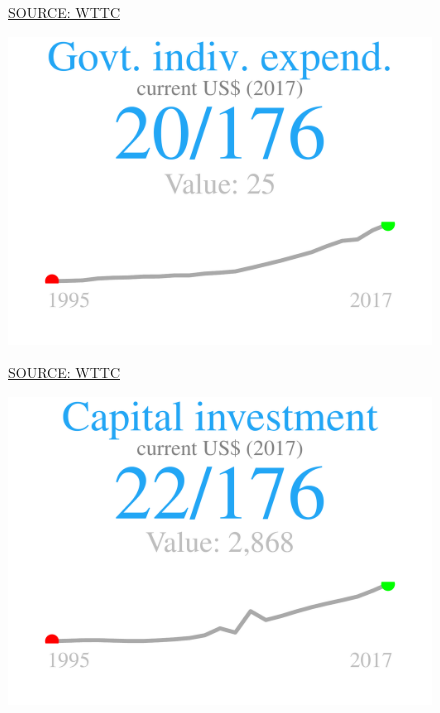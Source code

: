 \documentclass{article}\usepackage[]{graphicx}\usepackage[]{color}
\makeatletter
\def\maxwidth{ %
  \ifdim\Gin@nat@width>\linewidth
    \linewidth
  \else
    \Gin@nat@width
  \fi
}
\makeatother
\begin{document}
\begin{figure}
\begin{minipage}[t]{0.99\textwidth}
\begin{minipage}[t]{0.56\textwidth}
\begin{minipage}[c]{0.30\textwidth}
{}



    \vspace{-2ex}
    \hspace{2ex}\tiny{\href{https://tool.wttc.org/}{\textcolor[HTML]{722FF5}{SOURCE: WTTC}}}
    \end{minipage}
    \begin{minipage}[c]{0.30\textwidth}


{\centering \includegraphics[width=\maxwidth]{figure/figure_sparkline5-1} 

}



    \vspace{-2ex}
    \hspace{2ex}\tiny{\href{https://tool.wttc.org/}{\textcolor[HTML]{722FF5}{SOURCE: WTTC}}}
    \end{minipage}
    \begin{minipage}[c]{0.30\textwidth}


{\centering \includegraphics[width=\maxwidth]{figure/figure_sparkline6-1} 

}
\end{minipage}
\end{minipage}
\end{minipage}
\end{figure}
\end{document}
